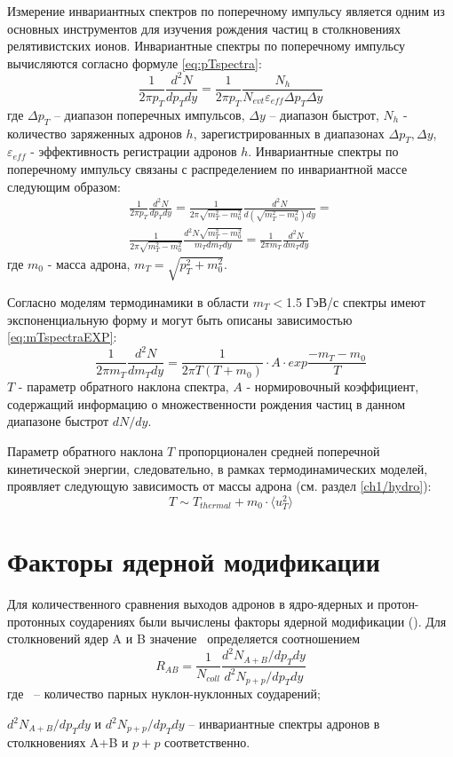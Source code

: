 Измерение инвариантных спектров по поперечному импульсу является одним из основных инструментов для изучения рождения частиц в столкновениях релятивистских ионов.
Инвариантные спектры по поперечному импульсу вычисляются согласно формуле \ref{eq:pTspectra}:
\begin{equation}
	\label{eq:pTspectra}
	\frac{1}{2\pi p_T} \frac{d^2 N}{dp_T dy}=\frac{1}{2\pi p_T}\frac{N_h}{N_{evt} \varepsilon_{eff} \Delta p_T \Delta y}
\end{equation}
где $\Delta p_T$ – диапазон поперечных импульсов, $\Delta y$ – диапазон быстрот, $N_h$ - количество заряженных адронов $h$, зарегистрированных в диапазонах  $\Delta p_T, \Delta y$,  $\varepsilon_{eff}$ - эффективность регистрации адронов $h$.
Инвариантные спектры по поперечному импульсу связаны с распределением по инвариантной массе следующим образом:
\begin{equation}
	\label{eq:mTspectra}
	\begin{split}
		\frac{1}{2\pi p_T} \frac{d^2 N}{dp_T dy}=
		\frac{1}{2\pi \sqrt{m_T^2-m_0^2}} \frac{d^2 N}{d(\sqrt{m_T^2-m_0^2})dy}=\\
		\frac{1}{2\pi \sqrt{m_T^2-m_0^2}} \frac{d^2 N \sqrt{m_T^2-m_0^2}}{m_T dm_Tdy}=\frac{1}{2\pi m_T} \frac{d^2 N}{dm_Tdy}
	\end{split}
\end{equation}
где $m_0$ - масса адрона, $m_T = \sqrt{p_{T}^{2}+m_0^2}$.


Согласно моделям термодинамики \cite{Thermal1, Thermal2} в области $m_T<$1.5 ГэВ/с спектры имеют экспоненциальную форму и могут быть описаны  зависимостью \ref{eq:mTspectraEXP}:
\begin{equation}
	\label{eq:mTspectraEXP}
	\frac{1}{2\pi m_T} \frac{d^2 N}{dm_T dy}=\frac{1}{2\pi T (T+m_0)}\cdot A \cdot exp{\frac{-m_T -m_0}{T}}
\end{equation}
$T$ - параметр обратного наклона спектра, $A$ - нормировочный коэффициент, содержащий информацию о множественности рождения частиц в данном диапазоне быстрот $dN/dy$.

Параметр обратного наклона $T$ пропорционален средней поперечной кинетической энергии, следовательно, в рамках термодинамических моделей, проявляет следующую зависимость от массы адрона (см. раздел \ref{ch1/hydro}):
$$ T \sim T_{thermal}+m_0 \cdot \langle u_T ^2 \rangle$$


\section{Факторы ядерной модификации}
Для количественного сравнения выходов адронов в ядро-ядерных и протон-протонных соударениях были вычислены факторы ядерной модификации (\rab). Для столкновений ядер A и B значение \rab \ определяется соотношением
\begin{equation}
	\label{eq:rab}
	R_{AB}=\frac{1}{N_{coll}}\frac{d^2 N_{A+B}/dp_T dy}{d^2 N_{p+p}/dp_T dy} 
\end{equation}
где \Ncoll \ – количество парных нуклон-нуклонных соударений;
 
$d^2 N_{A+B}/dp_T dy$ и $d^2 N_{p+p}/dp_T dy$ – инвариантные спектры адронов в столкновениях A+B и $p+p$ соответственно.




